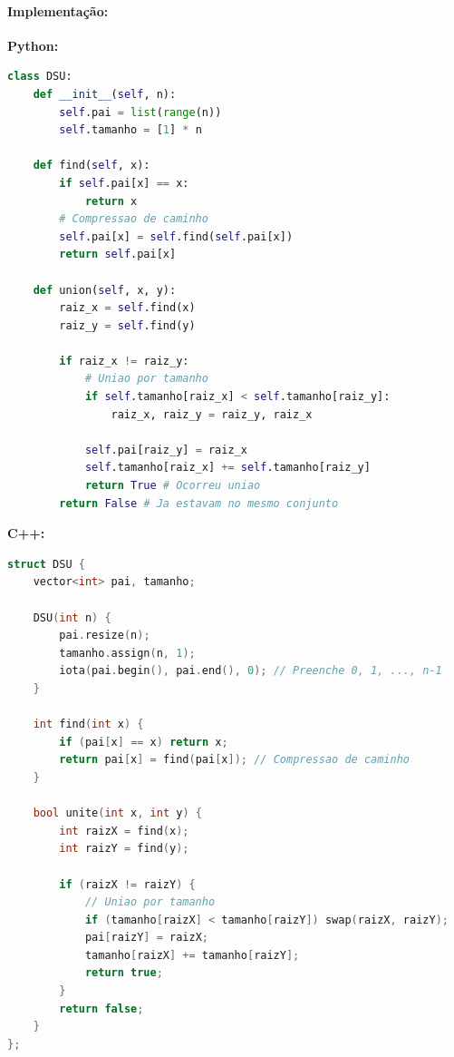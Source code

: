 \paragraph{Implementação: }\mbox{}
\textbf{Python: }
\begin{lstlisting}[language=Python]
class DSU:
    def __init__(self, n):
        self.pai = list(range(n))
        self.tamanho = [1] * n
        
    def find(self, x):
        if self.pai[x] == x:
            return x
        # Compressao de caminho
        self.pai[x] = self.find(self.pai[x])
        return self.pai[x]
        
    def union(self, x, y):
        raiz_x = self.find(x)
        raiz_y = self.find(y)
        
        if raiz_x != raiz_y:
            # Uniao por tamanho
            if self.tamanho[raiz_x] < self.tamanho[raiz_y]:
                raiz_x, raiz_y = raiz_y, raiz_x
                
            self.pai[raiz_y] = raiz_x
            self.tamanho[raiz_x] += self.tamanho[raiz_y]
            return True # Ocorreu uniao
        return False # Ja estavam no mesmo conjunto
\end{lstlisting}

\vspace{0.3cm}
\textbf{C++:}
\begin{lstlisting}[language=C++]
struct DSU {
    vector<int> pai, tamanho;
    
    DSU(int n) {
        pai.resize(n);
        tamanho.assign(n, 1);
        iota(pai.begin(), pai.end(), 0); // Preenche 0, 1, ..., n-1
    }
    
    int find(int x) {
        if (pai[x] == x) return x;
        return pai[x] = find(pai[x]); // Compressao de caminho
    }
    
    bool unite(int x, int y) {
        int raizX = find(x);
        int raizY = find(y);
        
        if (raizX != raizY) {
            // Uniao por tamanho
            if (tamanho[raizX] < tamanho[raizY]) swap(raizX, raizY);
            pai[raizY] = raizX;
            tamanho[raizX] += tamanho[raizY];
            return true;
        }
        return false;
    }
};
\end{lstlisting}
\newpage